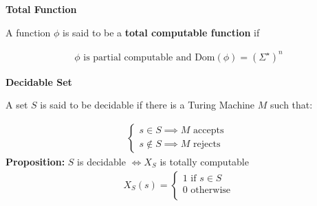 {\bf Total Function}

A function  $\phi$ is said to be a {\bf total computable function} if 

\begin{align} 
\phi \text{ is partial computable and } \text{Dom}(\phi) =  (\Sigma^\star)^n
\end{align}

{\bf Decidable Set}

A  set $S$ is said to be decidable if there is a Turing Machine $M$ such that:

\begin{align} 
   \begin{cases}
 s \in  S \implies M  \text{ accepts } \\    
  s \notin  S  \implies M  \text{ rejects }   
\end{cases}
\end{align}
{\bf Proposition:}    $S $ is decidable $\iff  X_S $ is totally computable 
\begin{align} 
   X_S(s) =  \begin{cases}
1 \text{ if } s \in S \\
0 \text{ otherwise} \\
\end{cases}
\end{align}
 
